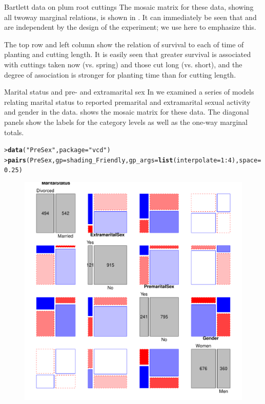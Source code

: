 \documentclass[10pt,krantz2]{krantz}\usepackage[]{graphicx}\usepackage[]{color}
\makeatletter
\newcommand{\hlnum}[1]{\textcolor[rgb]{0.686,0.059,0.569}{#1}}%
\newcommand{\hlstr}[1]{\textcolor[rgb]{0.192,0.494,0.8}{#1}}%
\newcommand{\hlopt}[1]{\textcolor[rgb]{0,0,0}{#1}}%
\newcommand{\hlstd}[1]{\textcolor[rgb]{0.345,0.345,0.345}{#1}}%
\newcommand{\hlkwc}[1]{\textcolor[rgb]{0.333,0.667,0.333}{#1}}%
\newcommand{\hlkwd}[1]{\textcolor[rgb]{0.737,0.353,0.396}{\textbf{#1}}}%
\newenvironment{kframe}{%
 \def\at@end@of@kframe{}%
 \ifinner\ifhmode%
  \def\at@end@of@kframe{\end{minipage}}%
  \begin{minipage}{\columnwidth}%
 \fi\fi%
 \def\FrameCommand##1{\hskip\@totalleftmargin \hskip-\fboxsep
 \colorbox{shadecolor}{##1}\hskip-\fboxsep
     \hskip-\linewidth \hskip-\@totalleftmargin \hskip\columnwidth}%
 \MakeFramed {\advance\hsize-\width
   \@totalleftmargin\z@ \linewidth\hsize
   \@setminipage}}%
 {\par\unskip\endMakeFramed%
 \at@end@of@kframe}
\newenvironment{knitrout}{}{} %
\renewenvironment{knitrout}{\small\renewcommand{\baselinestretch}{.85}}{} %
\makeatother
\begin{document}
\begin{Example}[bartlett]{Bartlett data on plum root cuttings}
\begin{knitrout}
\end{knitrout}
The mosaic matrix for these data, showing all twoway marginal relations, is shown
in .
It can immediately be seen that  and  are independent
by the design of the experiment; we use  here to emphasize
this.

The top row and left column show the relation of survival to each of time of planting
and cutting length.  It is easily seen that greater survival is associated with
cuttings taken now (vs. spring) and those cut long (vs. short),
and the degree of association is stronger for planting time than for cutting length.
\end{Example}

\begin{Example}[marital2]{Marital status and pre- and extramarital sex}
In  we examined a series of models relating marital
status to reported premarital and extramarital sexual activity and gender in the
 data.
 shows the mosaic matrix for these data.
The diagonal panels show the labels for the category levels as well as
the one-way marginal totals.

\begin{knitrout}
\color{fgcolor}\begin{kframe}
\begin{alltt}
\hlstd{> }\hlkwd{data}\hlstd{(}\hlstr{"PreSex"}\hlstd{,} \hlkwc{package} \hlstd{=} \hlstr{"vcd"}\hlstd{)}
\hlstd{> }\hlkwd{pairs}\hlstd{(PreSex,} \hlkwc{gp} \hlstd{= shading_Friendly,} \hlkwc{gp_args} \hlstd{=} \hlkwd{list}\hlstd{(}\hlkwc{interpolate} \hlstd{=} \hlnum{1} \hlopt{:} \hlnum{4}\hlstd{),} \hlkwc{space} \hlstd{=} \hlnum{0.25}\hlstd{)}
\end{alltt}
\end{kframe}\begin{figure}[!htb]

\centerline{\includegraphics[width=.8\textwidth]{ch05/fig/marital-pairs-1} }


\end{figure}
\end{knitrout}
\end{Example}
\end{document}
